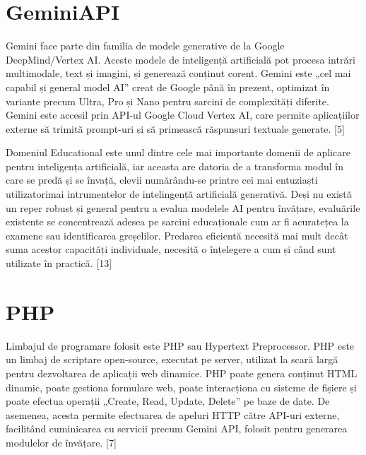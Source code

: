 \section{GeminiAPI}

Gemini face parte din familia de modele generative de la Google DeepMind/Vertex AI. Aceste modele de inteligență artificială pot procesa intrări multimodale, text și imagini, și generează
conținut corent. Gemini este „cel mai capabil și general model AI” creat de Google până în prezent, optimizat în variante precum Ultra, Pro și Nano pentru sarcini de complexități diferite. 
Gemini este accesil prin API-ul Google Cloud Vertex AI, care permite aplicațiilor externe să trimită prompt-uri și să primească răspunsuri textuale generate. [5]

Domeniul Educational este unul dintre cele mai importante domenii de aplicare pentru inteligența artificială, iar aceasta are datoria de a transforma modul în care se predă și se învață, 
elevii numărându-se printre cei mai entuziaști utilizatorimai intrumentelor de intelingență artificială generativă. Deși nu există un reper robust și general pentru a evalua modelele AI 
pentru învățare, evaluările existente se concentrează adesea pe sarcini educaționale cum ar fi acuratețea la examene sau identificarea greșelilor. Predarea eficientă necesită mai 
mult decât suma acestor capacități individuale, necesită o înțelegere a cum și când sunt utilizate în practică. [13] 

\section{PHP}

Limbajul de programare folosit este PHP sau Hypertext Preprocessor. PHP este un limbaj de scriptare open-source, executat pe server, utilizat la scară largă pentru dezvoltarea de aplicații 
web dinamice. PHP poate genera conținut HTML dinamic, poate gestiona formulare web, poate interacționa cu sisteme de fișiere și poate efectua operații „Create, Read, Update, Delete” pe baze 
de date. De asemenea, acesta permite efectuarea de apeluri HTTP către API-uri externe, facilitând cuminicarea cu servicii precum Gemini API, folosit pentru generarea modulelor de învățare. [7]